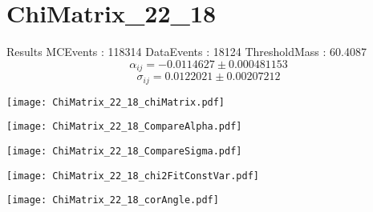 \documentclass[a4paper,12pt]{article}
\begin{document}
\section{ChiMatrix\_22\_18}
\begin{minipage}{0.49\linewidth} Results \newline
MCEvents : 118314\newline
DataEvents : 18124 \newline
ThresholdMass : 60.4087\\
$$\alpha_{ij} = -0.0114627\pm 0.000481153$$
$$\sigma_{ij} = 0.0122021\pm 0.00207212$$
\end{minipage}\hfill
\begin{minipage}{0.49\linewidth} 
\texttt{[image: ChiMatrix\_22\_18\_chiMatrix.pdf]}\\
\end{minipage}
\hfill
\begin{minipage}{0.49\linewidth} 
\texttt{[image: ChiMatrix\_22\_18\_CompareAlpha.pdf]}\\
\end{minipage}
\hfill
\begin{minipage}{0.49\linewidth} 
\texttt{[image: ChiMatrix\_22\_18\_CompareSigma.pdf]}\\
\end{minipage}
\begin{minipage}{0.49\linewidth} 
\texttt{[image: ChiMatrix\_22\_18\_chi2FitConstVar.pdf]}\\
\end{minipage}
\hfill
\begin{minipage}{0.49\linewidth} 
\texttt{[image: ChiMatrix\_22\_18\_corAngle.pdf]}\\
\end{minipage}
\end{document}
